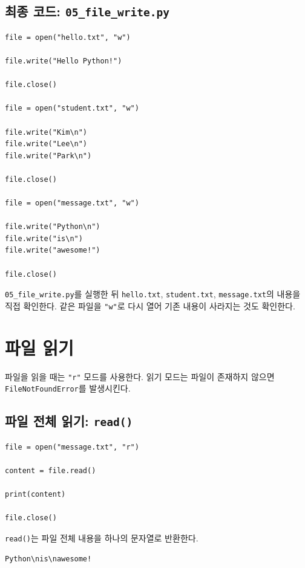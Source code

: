 \documentclass[11pt,a4paper]{article}
\begin{document}
\subsection{최종 코드: \texttt{05\_file\_write.py}}

\begin{lstlisting}
file = open("hello.txt", "w")

file.write("Hello Python!")

file.close()

file = open("student.txt", "w")

file.write("Kim\n")
file.write("Lee\n")
file.write("Park\n")

file.close()

file = open("message.txt", "w")

file.write("Python\n")
file.write("is\n")
file.write("awesome!")

file.close()
\end{lstlisting}

\begin{practicebox}
\texttt{05\_file\_write.py}를 실행한 뒤 \texttt{hello.txt}, \texttt{student.txt}, \texttt{message.txt}의 내용을 직접 확인한다. 같은 파일을 \texttt{"w"}로 다시 열어 기존 내용이 사라지는 것도 확인한다.
\end{practicebox}

\section{파일 읽기}

파일을 읽을 때는 \texttt{"r"} 모드를 사용한다. 읽기 모드는 파일이 존재하지 않으면 \texttt{FileNotFoundError}를 발생시킨다.

\subsection{파일 전체 읽기: \texttt{read()}}

\begin{lstlisting}
file = open("message.txt", "r")

content = file.read()

print(content)

file.close()
\end{lstlisting}

\texttt{read()}는 파일 전체 내용을 하나의 문자열로 반환한다.

\begin{verbatim}
Python\nis\nawesome!
\end{verbatim}
\end{document}

